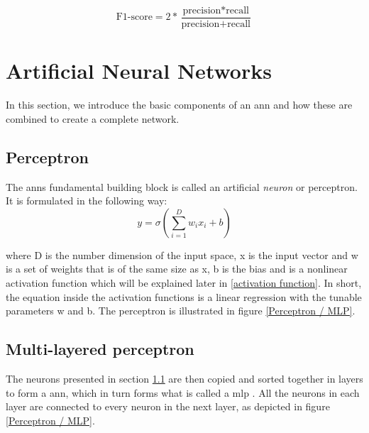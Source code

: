         \begin{equation}
            \textrm{F1-score} = 2 * \dfrac{\textrm{precision} * \textrm{recall}}{\textrm{precision} + \textrm{recall}}
        \end{equation}
        
        


\section{Artificial Neural Networks} \label{neural networks}
    In this section, we introduce the basic components of an \gls{ann} and how these are combined to create a complete network.

    \subsection{Perceptron} \label{perceptron}
        The \gls{ann}s fundamental building block is called an artificial \textit{neuron} or perceptron. It is formulated in the following way\cite{razavi2021deep_exp_per}:
            \begin{equation} \label{eq_perceptron}
                y = \sigma(\sum_{i=1}^{D}w_ix_i + b)
            \end{equation}
            
        where D is the number dimension of the input space, x is the input vector and w is a set of weights that is of the same size as x, b is the bias and {\textsigma} is a nonlinear activation function which will be explained later in \ref{activation function}. In short, the equation inside the activation functions is a linear regression with the tunable parameters w and b. The perceptron is illustrated in figure \ref{Perceptron / MLP}.
    
    \subsection{Multi-layered perceptron} \label{MLP}
        The neurons presented in section \ref{perceptron} are then copied and sorted together in layers to form a \gls{ann}, which in turn forms what is called a \gls{mlp} \cite{razavi2021deep_exp_per}. All the neurons in each layer are connected to every neuron in the next layer, as depicted in figure \ref{Perceptron / MLP}.
        
